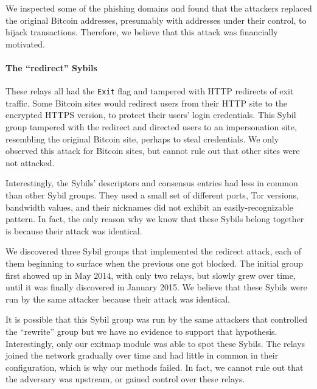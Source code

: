 We inspected some of the phishing domains and found that the attackers replaced
the original Bitcoin addresses, presumably with addresses under their control,
to hijack transactions.  Therefore, we believe that this attack was financially
motivated.

\paragraph{The ``redirect'' Sybils}
These relays all had the \texttt{Exit} flag and tampered with HTTP redirects of
exit traffic.  Some Bitcoin sites would redirect users from their HTTP site to
the encrypted HTTPS version, to protect their users' login credentials.  This
Sybil group tampered with the redirect and directed users to an impersonation
site, resembling the original Bitcoin site, perhaps to steal credentials.  We
only observed this attack for Bitcoin sites, but cannot rule out that other
sites were not attacked.

Interestingly, the Sybils' descriptors and consensus entries had less in common
than other Sybil groups.  They used a small set of different ports, Tor
versions, bandwidth values, and their nicknames did not exhibit an
easily-recognizable pattern.  In fact, the only reason why we know that these
Sybils belong together is because their attack was identical.

We discovered three Sybil groups that implemented the redirect attack, each of
them beginning to surface when the previous one got blocked.  The initial group
first showed up in May 2014, with only two relays, but slowly grew over time,
until it was finally discovered in January 2015.  We believe that these Sybils
were run by the same attacker because their attack was identical.

It is possible that this Sybil group was run by the same attackers that
controlled the ``rewrite'' group but we have no evidence to support that
hypothesis.  Interestingly, only our exitmap module was able to spot these
Sybils.  The relays joined the network gradually over time and had little in
common in their configuration, which is why our \sys methods failed.  In fact,
we cannot rule out that the adversary was upstream, or gained control over these
relays.

